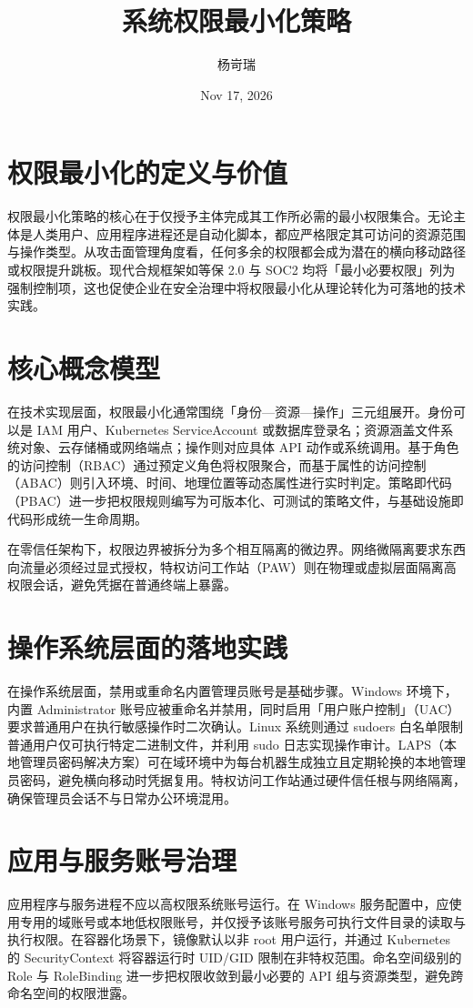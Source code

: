 \title{系统权限最小化策略}
\author{杨岢瑞}
\date{Nov 17, 2026}
\maketitle
\chapter{权限最小化的定义与价值}
权限最小化策略的核心在于仅授予主体完成其工作所必需的最小权限集合。无论主体是人类用户、应用程序进程还是自动化脚本，都应严格限定其可访问的资源范围与操作类型。从攻击面管理角度看，任何多余的权限都会成为潜在的横向移动路径或权限提升跳板。现代合规框架如等保 2.0 与 SOC2 均将「最小必要权限」列为强制控制项，这也促使企业在安全治理中将权限最小化从理论转化为可落地的技术实践。\par
\chapter{核心概念模型}
在技术实现层面，权限最小化通常围绕「身份—资源—操作」三元组展开。身份可以是 IAM 用户、Kubernetes ServiceAccount 或数据库登录名；资源涵盖文件系统对象、云存储桶或网络端点；操作则对应具体 API 动作或系统调用。基于角色的访问控制（RBAC）通过预定义角色将权限聚合，而基于属性的访问控制（ABAC）则引入环境、时间、地理位置等动态属性进行实时判定。策略即代码（PBAC）进一步把权限规则编写为可版本化、可测试的策略文件，与基础设施即代码形成统一生命周期。\par
在零信任架构下，权限边界被拆分为多个相互隔离的微边界。网络微隔离要求东西向流量必须经过显式授权，特权访问工作站（PAW）则在物理或虚拟层面隔离高权限会话，避免凭据在普通终端上暴露。\par
\chapter{操作系统层面的落地实践}
在操作系统层面，禁用或重命名内置管理员账号是基础步骤。Windows 环境下，内置 Administrator 账号应被重命名并禁用，同时启用「用户账户控制」（UAC）要求普通用户在执行敏感操作时二次确认。Linux 系统则通过 sudoers 白名单限制普通用户仅可执行特定二进制文件，并利用 sudo 日志实现操作审计。LAPS（本地管理员密码解决方案）可在域环境中为每台机器生成独立且定期轮换的本地管理员密码，避免横向移动时凭据复用。特权访问工作站通过硬件信任根与网络隔离，确保管理员会话不与日常办公环境混用。\par
\chapter{应用与服务账号治理}
应用程序与服务进程不应以高权限系统账号运行。在 Windows 服务配置中，应使用专用的域账号或本地低权限账号，并仅授予该账号服务可执行文件目录的读取与执行权限。在容器化场景下，镜像默认以非 root 用户运行，并通过 Kubernetes 的 SecurityContext 将容器运行时 UID/GID 限制在非特权范围。命名空间级别的 Role 与 RoleBinding 进一步把权限收敛到最小必要的 API 组与资源类型，避免跨命名空间的权限泄露。\par
